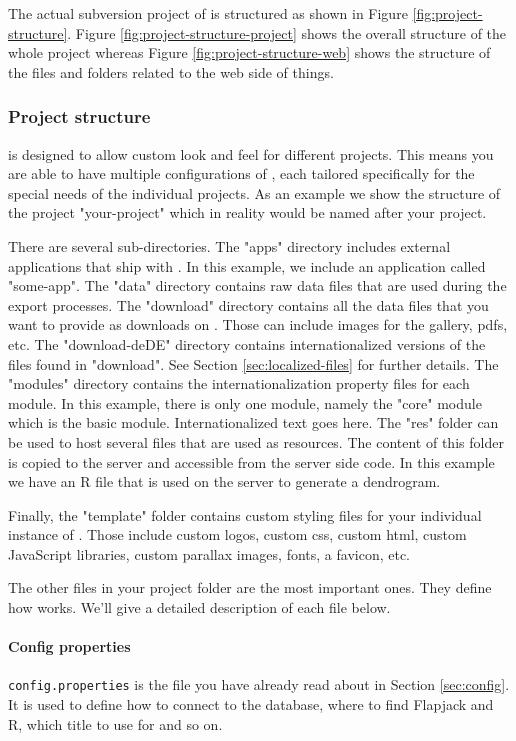 \noindent
The actual subversion project of {\germinate} is structured as shown in Figure \ref{fig:project-structure}. Figure \ref{fig:project-structure-project} shows the overall structure of the whole project whereas Figure \ref{fig:project-structure-web} shows the structure of the files and folders related to the web side of things.

\subsubsection{Project structure}
{\germinate} is designed to allow custom look and feel for different projects. This means you are able to have multiple configurations of {\germinate}, each tailored specifically for the special needs of the individual projects. As an example we show the structure of the project "your-project" which in reality would be named after your project.

There are several sub-directories. The "apps" directory includes external applications that ship with {\germinate}. In this example, we include an application called "some-app". The "data" directory contains raw data files that are used during the export processes. The "download" directory contains all the data files that you want to provide as downloads on {\germinate}. Those can include images for the gallery, pdfs, etc. The "download-de\textunderscore DE" directory contains internationalized versions of the files found in "download". See Section \ref{sec:localized-files} for further details. The "modules" directory contains the internationalization property files for each module. In this example, there is only one module, namely the "core" module which is the basic {\germinate} module. Internationalized text goes here. The "res" folder can be used to host several files that are used as resources. The content of this folder is copied to the server and accessible from the server side code. In this example we have an R file that is used on the server to generate a dendrogram.

Finally, the "template" folder contains custom styling files for your individual instance of {\germinate}. Those include custom logos, custom css, custom html, custom JavaScript libraries, custom parallax images, fonts, a favicon, etc.

The other files in your project folder are the most important ones. They define how {\germinate} works. We'll give a detailed description of each file below.

\paragraph{Config properties}
\texttt{config.properties} is the file you have already read about in Section \ref{sec:config}. It is used to define how to connect to the database, where to find Flapjack and R, which title to use for {\germinate} and so on.

